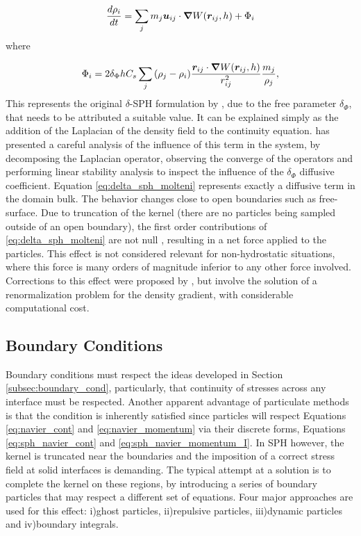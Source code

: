 %
\begin{equation} \label{eq:sph_navier_cont_delta_sph}
	\frac{{d\rho_i }}{{dt}} = \sum_j{{m_j} \boldsymbol{u}_{ij} \cdot \boldsymbol{\nabla} W(\boldsymbol{r}_{ij}, h)+\Phi_i}
\end{equation}
%
where

%
\begin{equation} \label{eq:delta_sph_molteni}
	\Phi_i =  2 \delta_\Phi h C_s \sum_j{(\rho_j-\rho_i) \frac{\boldsymbol{r}_{ij} \cdot \boldsymbol{\nabla} W(\boldsymbol{r}_{ij}, h)}{{r}_{ij}^2} \frac{m_j}{\rho_j}},
\end{equation}
%
This represents the original $\delta$-\ac{SPH} formulation by \cite{Molteni-2009}, due to the free parameter $\delta_\Phi$, that needs to be attributed a suitable value. It can be explained simply as the addition of the Laplacian of the density field to the continuity equation. \cite{Antuono-2012} has presented a careful analysis of the influence of this term in the system, by decomposing the Laplacian operator, observing the converge of the operators and performing linear stability analysis to inspect the influence of the $\delta_\Phi$ diffusive coefficient. Equation \eqref{eq:delta_sph_molteni} represents exactly a diffusive term in the domain bulk. The behavior changes close to open boundaries such as free-surface. Due to truncation of the kernel (there are no particles being sampled outside of an open boundary), the first order contributions of \eqref{eq:delta_sph_molteni} are not null \citep{Antuono-2010}, resulting in a net force applied to the particles. This effect is not considered relevant for non-hydrostatic situations, where this force is many orders of magnitude inferior to any other force involved. Corrections to this effect were proposed by \cite{Antuono-2010}, but involve the solution of a renormalization problem for the density gradient, with considerable computational cost.



\subsection{Boundary Conditions}
\label{sec:BCs}

Boundary conditions must respect the ideas developed in Section \ref{subsec:boundary_cond}, particularly, that continuity of stresses across any interface must be respected. Another apparent advantage of particulate methods is that the condition is inherently satisfied since particles will respect Equations \eqref{eq:navier_cont} and \eqref{eq:navier_momentum} via their discrete forms, Equations \eqref{eq:sph_navier_cont} and \eqref{eq:sph_navier_momentum_I}. In \ac{SPH} however, the kernel is truncated near the boundaries and the imposition of a correct stress field at solid interfaces is demanding. The typical attempt at a solution is to complete the kernel on these regions, by introducing a series of boundary particles that may respect a different set of equations. Four major approaches are used for this effect: i)ghost particles, ii)repulsive particles, iii)dynamic particles and iv)boundary integrals. 

